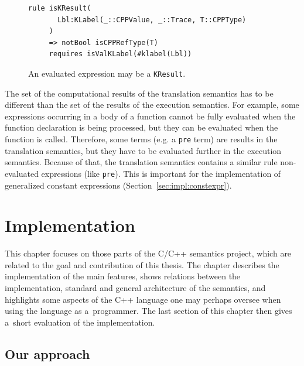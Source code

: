 \documentclass[nolot,nolof,nocover,printed]{fithesis3}
\begin{document}
\begin{figure}[ht]
\begin{lstlisting}
rule isKResult(
       Lbl:KLabel(_::CPPValue, _::Trace, T::CPPType)
     )
     => notBool isCPPRefType(T)
     requires isValKLabel(#klabel(Lbl))
\end{lstlisting}
\caption{An evaluated expression may be a \texttt{KResult}.}
\label{lst:evalExprIsKResult}
\end{figure}

The set of the computational results of the translation semantics has to be different than the set of the results of the execution semantics. For example, some expressions occurring in a body of a function cannot be fully evaluated when the function declaration is being processed, but they can be evaluated when the function is called. Therefore, some terms (e.g. a \texttt{pre} term) are results in the translation semantics, but they have to be evaluated further in the execution semantics. Because of that, the translation semantics contains a similar rule non-evaluated expressions (like \texttt{pre}). This is important for the implementation of generalized constant expressions (Section~\ref{sec:impl:constexpr}).




\chapter{Implementation}\label{chap:implement}

This chapter focuses on those parts of the C/C++ semantics project, which are related to the goal and contribution of this thesis. The chapter describes the implementation of the main features, shows relations between the implementation, standard and general architecture of the semantics, and highlights some aspects of the C++ language one may perhaps oversee when using the language as a~programmer. The last section of this chapter then gives a~short evaluation of the implementation.

\section{Our approach}
\end{document}
